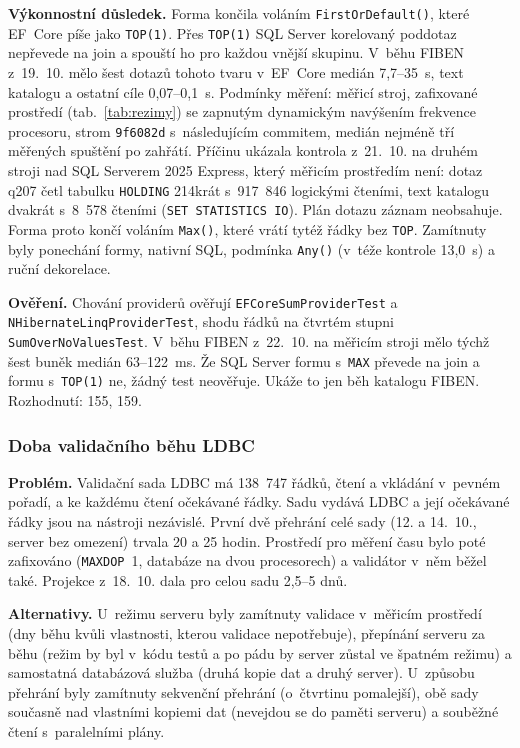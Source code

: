 \textbf{Výkonnostní důsledek.} Forma končila voláním \texttt{FirstOrDefault()}, které EF~Core píše jako \texttt{TOP(1)}. Přes \texttt{TOP(1)} SQL Server korelovaný poddotaz nepřevede na join a spouští ho pro každou vnější skupinu. V~běhu FIBEN z~19.~10. mělo šest dotazů tohoto tvaru v~EF~Core medián 7,7--35~s, text katalogu a ostatní cíle 0,07--0,1~s. Podmínky měření: měřicí stroj, zafixované prostředí (tab.~\ref{tab:rezimy}) se zapnutým dynamickým navýšením frekvence procesoru, strom \texttt{9f6082d} s~následujícím commitem, medián nejméně tří měřených spuštění po zahřátí. Příčinu ukázala kontrola z~21.~10. na druhém stroji nad SQL Serverem 2025 Express, který měřicím prostředím není: dotaz q207 četl tabulku \texttt{HOLDING} 214krát s~917~846 logickými čteními, text katalogu dvakrát s~8~578 čteními (\texttt{SET STATISTICS IO}). Plán dotazu záznam neobsahuje. Forma proto končí voláním \texttt{Max()}, které vrátí tytéž řádky bez \texttt{TOP}. Zamítnuty byly ponechání formy, nativní SQL, podmínka \texttt{Any()} (v~téže kontrole 13,0~s) a ruční dekorelace.

\textbf{Ověření.} Chování providerů ověřují \texttt{EFCoreSumProviderTest} a \texttt{NHibernateLinqProviderTest}, shodu řádků na čtvrtém stupni \texttt{SumOverNoValuesTest}. V~běhu FIBEN z~22.~10. na měřicím stroji mělo týchž šest buněk medián 63--122~ms. Že SQL Server formu s~\texttt{MAX} převede na join a formu s~\texttt{TOP(1)} ne, žádný test neověřuje. Ukáže to jen běh katalogu FIBEN. Rozhodnutí: 155, 159.

\subsubsection*{Doba validačního běhu LDBC}

\textbf{Problém.} Validační sada LDBC má 138~747 řádků, čtení a vkládání v~pevném pořadí, a ke každému čtení očekávané řádky. Sadu vydává LDBC a její očekávané řádky jsou na nástroji nezávislé. První dvě přehrání celé sady (12. a 14.~10., server bez omezení) trvala 20 a 25 hodin. Prostředí pro měření času bylo poté zafixováno (\texttt{MAXDOP}~1, databáze na dvou procesorech) a validátor v~něm běžel také. Projekce z~18.~10. dala pro celou sadu 2,5--5 dnů.

\textbf{Alternativy.} U~režimu serveru byly zamítnuty validace v~měřicím prostředí (dny běhu kvůli vlastnosti, kterou validace nepotřebuje), přepínání serveru za běhu (režim by byl v~kódu testů a po pádu by server zůstal ve špatném režimu) a samostatná databázová služba (druhá kopie dat a druhý server). U~způsobu přehrání byly zamítnuty sekvenční přehrání (o~čtvrtinu pomalejší), obě sady současně nad vlastními kopiemi dat (nevejdou se do paměti serveru) a souběžné čtení s~paralelními plány.

